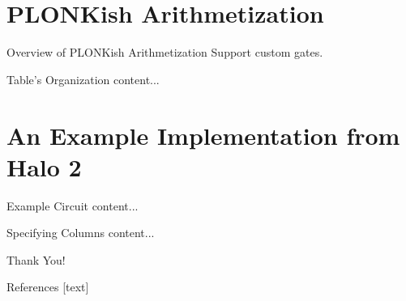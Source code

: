 \documentclass{beamer}
\begin{document}
	\section{PLONKish Arithmetization}
	\begin{frame}{Overview of PLONKish Arithmetization}
		Support custom gates.
	\end{frame}

	\begin{frame}{Table's Organization}
		content...
	\end{frame}

	\section{An Example Implementation from Halo 2}
	\begin{frame}{Example Circuit}
		content...
	\end{frame}
	\begin{frame}{Specifying Columns}
		content...
	\end{frame}

	\begin{frame}{}
		\begin{center}
			{\fontsize{20}{20}\selectfont Thank You!}
		\end{center}
	\end{frame}

	\begin{frame}[allowframebreaks]{References}
		
		
		
	\end{frame}
	
\end{document}
